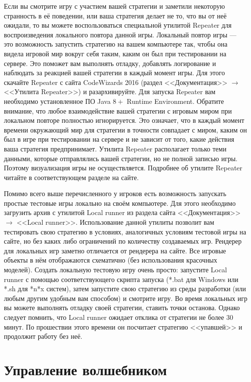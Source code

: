 Если вы смотрите игру с участием вашей стратегии и заметили некоторую странность в её поведении, или ваша стратегия делает не то, что вы от
неё ожидали, то вы можете воспользоваться специальной утилитой Repeater для воспроизведения локального повтора данной игры. Локальный повтор
игры --- это возможность запустить стратегию на вашем компьютере так, чтобы она видела игровой мир вокруг себя таким, каким он был при
тестировании на сервере. Это поможет вам выполнять отладку, добавлять логирование и наблюдать за реакцией вашей стратегии в каждый момент
игры. Для этого скачайте Repeater с сайта CodeWizards 2016 (раздел <<Документация>> $\rightarrow$ <<Утилита Repeater>>) и разархивируйте.
Для запуска Repeater вам необходимо установленное ПО Java $8+$ Runtime Environment. Обратите внимание, что любое взаимодействие вашей
стратегии с игровым миром при локальном повторе полностью игнорируется. Это означает, что в каждый момент времени окружающий мир для
стратегии в точности совпадает с миром, каким он был в игре при тестировании на сервере и не зависит от того, какие действия ваша стратегия
предпринимает. Утилита Repeater располагает только теми данными, которые отправлялись вашей стратегии, но не полной записью игры. Поэтому
визуализация игры не осуществляется. Подробнее об утилите Repeater читайте в соответствующем разделе на сайте.

Помимо всего выше перечисленного у игроков есть возможность запускать простые тестовые игры локально на своём компьютере. Для этого
необходимо загрузить архив с утилитой Local runner из раздела сайта <<Документация>> $\rightarrow$ <<Local runner>>. Использование данной
утилиты позволит вам тестировать свою стратегию в условиях, аналогичных условиям тестовой игры на сайте, но без каких либо ограничений по
количеству создаваемых игр. Рендерер для локальных игр заметно отличается от рендерера на сайте. Все игровые объекты в нём отображаются
схематично (без использования красочных моделей). Создать локальную тестовую игру очень просто: запустите Local runner с помощью
соответствующего скрипта запуска (*.bat для Windows или *.sh для *n*x систем), затем запустите свою стратегию из среды разработки (или любым
другим удобным вам способом) и смотрите игру. Во время локальных игр вы можете выполнять отладку своей стратегии, ставить точки останова.
Однако следует помнить, что Local runner ожидает отклика от стратегии не более $30$ минут. По прошествии этого времени он посчитает
стратегию <<упавшей>> и продолжит работу без неё.

\section{Управление волшебником}

